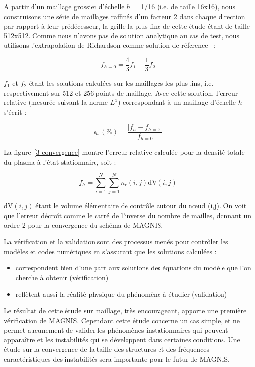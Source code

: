 \begin{refsection}
A partir d'un maillage grossier d'échelle $h=\,$1/16 (i.e. de taille 16x16),
nous construisons une série de maillages raffinés d'un facteur 2 dans chaque direction par rapport à leur prédécesseur, la grille la
plus fine de cette étude étant de taille 512x512. Comme nous n'avons pas de
solution analytique au cas de test, nous utilisons l'extrapolation de
Richardson comme solution de référence~\parencite{Roache} :

\begin{equation}
f_{h=0}=\frac{4}{3}f_{1}-\frac{1}{3}f_2
\end{equation}

$f_{1}$ et $f_2$ étant les solutions calculées sur les maillages les plus fins,
i.e. respectivement sur 512 et 256 points de maillage. Avec cette solution,
l'erreur relative (mesurée suivant la norme $L^1$) correspondant à un maillage
d'échelle $h$ s'écrit :

\begin{equation}
\epsilon_h\,(\text{\%})=\frac{|f_h-f_{h=0}|}{f_{h=0}}
\end{equation}

La figure~\ref{3-convergence} montre l'erreur relative calculée pour la densité
totale du plasma à l'état stationnaire, soit :

\begin{equation}
f_h=\sum_{i=1}^{N}\sum_{j=1}^{N}n_e(i,j)\text{dV}(i,j)
\end{equation}

$\text{dV}(i,j)$ étant le volume élémentaire de contrôle autour du n\oe ud
(i,j). On voit que l'erreur décroît comme le carré de l'inverse du nombre de
mailles, donnant un ordre 2 pour la convergence du schéma de MAGNIS.

La vérification et la validation sont des processus menés
pour contrôler les modèles et codes numériques en s'assurant que les solutions
calculées :

\begin{itemize}
  \item correspondent bien d'une part aux solutions des
  équations du modèle que l'on cherche à obtenir (vérification)
	\item reflètent aussi la réalité
	physique du phénomène à étudier (validation)
	\end{itemize}
	
Le résultat de cette étude sur maillage, très encourageant, apporte une première
vérification de MAGNIS. Cependant cette étude concerne un cas simple,
et ne permet aucunement de valider les phénomènes instationnaires qui peuvent
apparaître et les instabilités qui se développent dans certaines
conditions. Une étude sur la convergence de la taille des structures et des
fréquences caractéristiques des instabilités sera importante pour le futur de
MAGNIS. 


\end{refsection}
